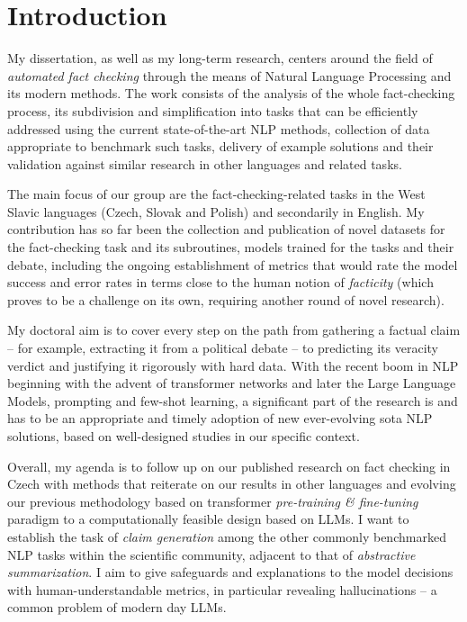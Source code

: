 
\chapter{Introduction}
\label{chap:intro}

My dissertation, as well as my long-term research, centers around the field of \textit{automated fact checking} through the means of Natural Language Processing and its modern methods.
The work consists of the analysis of the whole fact-checking process, its subdivision and simplification into tasks that can be efficiently addressed using the current state-of-the-art NLP methods, collection of data appropriate to benchmark such tasks, delivery of example solutions and their validation against similar research in other languages and related tasks.

The main focus of our group are the fact-checking-related tasks in the West Slavic languages (Czech, Slovak and Polish) and secondarily in English.
My contribution has so far been the collection and publication of novel datasets for the fact-checking task and its subroutines, models trained for the tasks and their debate, including the ongoing establishment of metrics that would rate the model success and error rates in terms close to the human notion of \textit{facticity} (which proves to be a challenge on its own, requiring another round of novel research). 

My doctoral aim is to cover every step on the path from gathering a factual claim -- for example, extracting it from a political debate -- to predicting its veracity verdict and justifying it rigorously with hard data.
With the recent boom in NLP beginning with the advent of transformer networks and later the Large Language Models, prompting and few-shot learning, a significant part of the research is and has to be an appropriate and timely adoption of new ever-evolving sota NLP solutions, based on well-designed studies in our specific context.

Overall, my agenda is to follow up on our published research on fact checking in Czech with methods that reiterate on our results in other languages and evolving our previous methodology based on transformer \textit{pre-training \& fine-tuning} paradigm to a computationally feasible design based on LLMs. 
I want to establish the task of \textit{claim generation} among the other commonly benchmarked NLP tasks within the scientific community, adjacent to that of \textit{abstractive summarization}.
I aim to give safeguards and explanations to the model decisions with human-understandable metrics, in particular revealing hallucinations -- a common problem of modern day LLMs.

